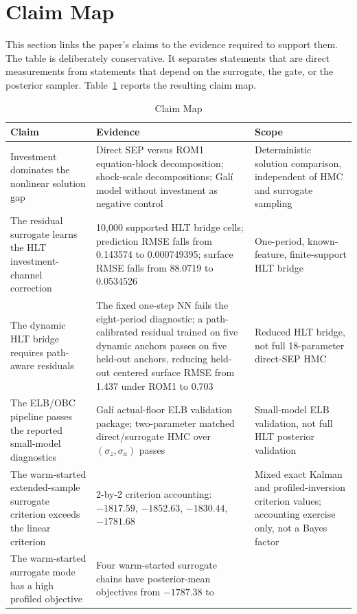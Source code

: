 \documentclass[12pt]{article}
\begin{document}
\section{Claim Map}
\label{apptech:claim_map}

This section links the paper's claims to the evidence required to support them.
The table is deliberately conservative. It separates statements that are direct
measurements from statements that depend on the surrogate, the gate, or the
posterior sampler. Table~\ref{tab:tech_claim_map} reports the resulting claim
map.

\begin{table}[htbp]
\centering
\caption{Claim Map}
\label{tab:tech_claim_map}
\begin{tabular}{p{}p{}p{}}
\toprule
Claim & Evidence & Scope \\
\midrule
Investment dominates the nonlinear solution gap & Direct SEP versus ROM1
equation-block decomposition; shock-scale decompositions; Gal\'i model without
investment as negative control & Deterministic solution comparison, independent
of HMC and surrogate sampling \\
The residual surrogate learns the HLT investment-channel correction & 10,000
supported HLT bridge cells; prediction RMSE falls from 0.143574 to 0.000749395;
surface RMSE falls from 88.0719 to 0.0534526 & One-period, known-feature,
finite-support HLT bridge \\
The dynamic HLT bridge requires path-aware residuals & The fixed one-step NN
fails the eight-period diagnostic; a path-calibrated residual trained on five
dynamic anchors passes on five held-out anchors, reducing held-out centered
surface RMSE from 1.437 under ROM1 to 0.703 & Reduced HLT bridge, not full
18-parameter direct-SEP HMC \\
The ELB/OBC pipeline passes the reported small-model diagnostics & Gal\'i
actual-floor ELB validation
package; two-parameter matched direct/surrogate HMC over
\((\sigma_z,\sigma_a)\) passes & Small-model ELB validation, not full HLT
posterior validation \\
The warm-started extended-sample surrogate criterion exceeds the linear
criterion & 2-by-2 criterion accounting:
\(-1817.59\), \(-1852.63\), \(-1830.44\), \(-1781.68\) & Mixed exact Kalman
and profiled-inversion criterion values; accounting exercise only, not a Bayes
factor \\
The warm-started surrogate mode has a high profiled objective & Four warm-started
surrogate chains have posterior-mean objectives from \(-1787.38\) to

\end{tabular}
\end{table}
\end{document}
